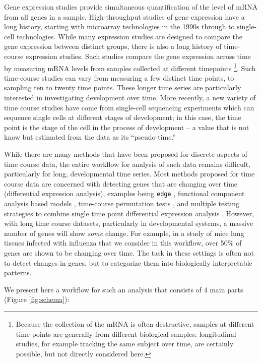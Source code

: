 \documentclass[9pt,a4paper,]{extarticle}
\begin{document}
Gene expression studies provide simultaneous quantification of the level of
mRNA from all genes in a sample. High-throughput studies of gene expression
have a long history, starting with microarray technologies in the 1990s
through to single-cell technologies. While many expression studies are
designed to compare the gene expression between distinct groups, there is also a
long history of time-course expression studies. Such studies compare the
gene expression
across time by measuring mRNA levels from samples collected at different
timepoints \footnote{Because the collection of the mRNA is often destructive, samples at
  different time points are generally from different biological samples;
  longitudinal studies, for example tracking the same subject over time, are
  certainly possible, but not directly considered here.}. Such time-course studies can vary from measuring a few
distinct time
points, to sampling ten to twenty time points. These longer time series are
particularly interested in investigating development over time. More recently,
a new variety of time course studies have come from single-cell sequencing experiments
\citep{shalek:single-cell, habib:div-seq, trapnell:dynamics}
which can sequence single cells at different stages of development; in this case,
the time point is the stage of the cell in the process of development -- a
value that is not know but estimated from the data as its ``pseudo-time.''

While there are many methods that have been proposed for discrete aspects of
time course data, the entire workflow for analysis of such data remains
difficult, particularly for long, developmental time series. Most methods
proposed for time course data are concerned with detecting genes that are
changing over time (differential expression analysis), examples being \texttt{edge}
\citep{storey:significance}, functional component analysis based models \citep{wu:more},
time-course permutation tests \citep{park:statistical}, and multiple testing
strategies to combine single time point differential expression analysis
\citep{sun:multiple}. However, with long time course datasets, particularly in
developmental systems, a massive number of genes will show \emph{some} change. For
example, in a study of mice lung tissues infected with influenza that we
consider in this workflow, over 50\% of genes
are shown to be changing over time. The task in these settings is often not to
detect changes in genes, but to categorize them into biologically interpretable
patterns.

We present here a workflow for such an analysis that consists of 4 main
parts (Figure \ref{fig:schema}):
\end{document}
